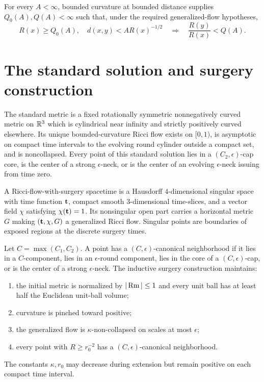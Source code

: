 For every $A<\infty$, bounded curvature at bounded distance supplies
$Q_0(A),Q(A)<\infty$ such that, under the required generalized-flow
hypotheses,
\[
  R(x)\geq Q_0(A),\quad
  d(x,y)<A R(x)^{-1/2}
  \quad\Longrightarrow\quad
  \frac{R(y)}{R(x)}<Q(A).
\]

\section{The standard solution and surgery construction}

The standard metric is a fixed rotationally symmetric nonnegatively curved
metric on $\mathbb{R}^3$ which is cylindrical near infinity and strictly positively
curved elsewhere. Its unique bounded-curvature Ricci flow exists on $[0,1)$,
is asymptotic on compact time intervals to the evolving round cylinder outside
a compact set, and is noncollapsed. Every point of this standard solution lies
in a $(C_2,\epsilon)$-cap core, is the center of a strong $\epsilon$-neck, or
is the center of an evolving $\epsilon$-neck issuing from time zero.

A Ricci-flow-with-surgery spacetime is a Hausdorff $4$-dimensional singular
space with time function ${\bf t}$, compact smooth $3$-dimensional time-slices,
and a vector field $\chi$ satisfying $\chi({\bf t})=1$. Its nonsingular open
part carries a horizontal metric $G$ making
$({\bf t},\chi,G)$ a generalized Ricci flow. Singular points are boundaries of
exposed regions at the discrete surgery times.

Let $C=\max(C_1,C_2)$. A point has a $(C,\epsilon)$-canonical neighborhood if
it lies in a $C$-component, lies in an $\epsilon$-round component, lies in the
core of a $(C,\epsilon)$-cap, or is the center of a strong $\epsilon$-neck.
The inductive surgery construction maintains:
\begin{enumerate}
\item the initial metric is normalized by $|\operatorname{Rm}|\leq1$ and every unit ball has
at least half the Euclidean unit-ball volume;
\item curvature is pinched toward positive;
\item the generalized flow is $\kappa$-non-collapsed on scales at most
$\epsilon$;
\item every point with $R\geq r_0^{-2}$ has a
$(C,\epsilon)$-canonical neighborhood.
\end{enumerate}
The constants $\kappa,r_0$ may decrease during extension but remain positive
on each compact time interval.


